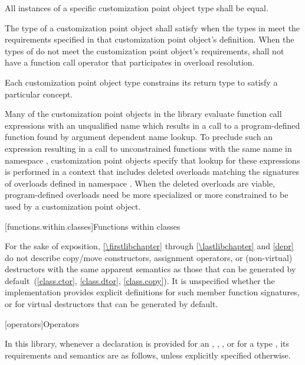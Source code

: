 \pnum
All instances of a specific customization point object type shall
be equal.

\pnum
The type  of a customization point object shall satisfy
when the types in  meet the requirements specified in that
customization point object's definition. When the types of  do
not meet the customization point object's requirements,  shall not have
a function call operator that participates in overload resolution.

\pnum
Each customization point object type constrains its return type to satisfy a
particular concept.

\pnum
\begin{note}
Many of the customization point objects in the library evaluate function call
expressions with an unqualified name which results in a call to a
program-defined function found by argument dependent name
lookup. To preclude such an expression resulting in a
call to unconstrained functions with the same name in namespace ,
customization point objects specify that lookup for these expressions is
performed in a context that includes deleted overloads matching the signatures
of overloads defined in namespace . When the deleted overloads are
viable, program-defined overloads need be more specialized
or more constrained to be used by a customization point
object.
\end{note}

[functions.within.classes]{Functions within classes}

\pnum
For the sake of exposition, \ref{\firstlibchapter} through \ref{\lastlibchapter}
and \ref{depr} do not describe copy/move constructors, assignment
operators, or (non-virtual) destructors with the same apparent
semantics as those that can be generated by default~(\ref{class.ctor}, \ref{class.dtor}, \ref{class.copy}).
%
%
%
It is unspecified whether
the implementation provides explicit definitions for such member function
signatures, or for virtual destructors that can be generated by default.

[operators]{Operators}

\pnum
In this library, whenever a declaration is provided for an ,
, , or 
for a type ,
its requirements and semantics are as follows,
unless explicitly specified otherwise.

